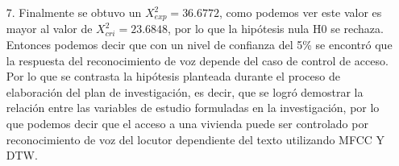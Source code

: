 \begin{enumerate}
\item[7.] Finalmente se obtuvo un $X^{2}_{exp} = 36.6772$, como podemos ver este valor es mayor al valor de $X^{2}_{cri} = 23.6848$, por lo que la hipótesis nula H0 se rechaza. Entonces podemos decir que con un nivel de confianza del 5\% se encontró que la respuesta del reconocimiento de voz depende del caso de control de acceso. Por lo que se contrasta la hipótesis planteada durante el proceso de elaboración del plan de investigación, es decir, que se logró demostrar la relación entre las variables de estudio formuladas en la investigación, por lo que podemos decir que el acceso a una vivienda puede ser controlado por reconocimiento de voz del locutor dependiente del texto utilizando MFCC Y DTW.

\end{enumerate}







